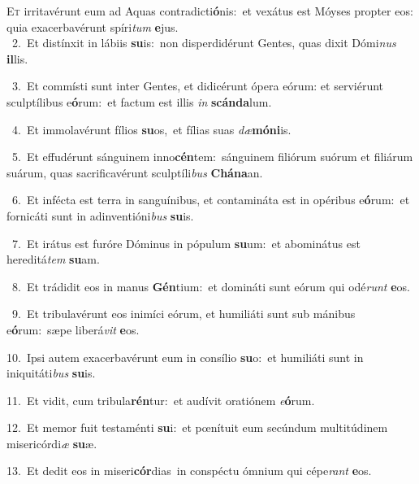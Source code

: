 \lettrine{\initial\textcolor{\initialcolor}{E}}{t} irritavérunt eum ad Aquas contradicti\-\textbf{ó}\-nis:~\star et vexátus est Móyses propter eos: quia exacerbavérunt spíri\textit{tum} \textbf{e}\-jus.\\
{\numbfont\textcolor{\numbcolor}{~2.}}~Et distínxit in lábiis \textbf{su}\-is:~\star non disperdidérunt Gentes, quas dixit Dómi\textit{nus} \textbf{il}\-lis.\par
{\numbfont\textcolor{\numbcolor}{~3.}}~Et commísti sunt inter Gentes, et didicérunt ópera eórum: et serviérunt sculptílibus e\-\textbf{ó}\-rum:~\star et factum est illis \textit{in} \textbf{scán}\-\textbf{da}lum.\par
{\numbfont\textcolor{\numbcolor}{~4.}}~Et immolavérunt fílios \textbf{su}\-os,~\star et fílias suas \textit{dæ}\-\textbf{mó}\textbf{ni}is.\par
{\numbfont\textcolor{\numbcolor}{~5.}}~Et effudérunt sánguinem inno\-\textbf{cén}\-tem:~\star sánguinem filiórum suórum et filiárum suárum, quas sacrificavérunt sculptíli\textit{bus} \textbf{Chá}\-\textbf{na}an.\par
{\numbfont\textcolor{\numbcolor}{~6.}}~Et infécta est terra in sanguínibus, et contamináta est in opéribus e\-\textbf{ó}\-rum:~\star et fornicáti sunt in adinventióni\textit{bus} \textbf{su}\-is.\par
{\numbfont\textcolor{\numbcolor}{~7.}}~Et irátus est furóre Dóminus in pópulum \textbf{su}\-um:~\star et abominátus est hereditá\textit{tem} \textbf{su}\-am.\par
{\numbfont\textcolor{\numbcolor}{~8.}}~Et trádidit eos in manus \textbf{Gén}\-tium:~\star et domináti sunt eórum qui odé\textit{runt} \textbf{e}\-os.\par
{\numbfont\textcolor{\numbcolor}{~9.}}~Et tribulavérunt eos inimíci eórum, et humiliáti sunt sub mánibus e\-\textbf{ó}\-rum:~\star sæpe liberá\textit{vit} \textbf{e}\-os.\par
{\numbfont\textcolor{\numbcolor}{10.}}~Ipsi autem exacerbavérunt eum in consílio \textbf{su}\-o:~\star et humiliáti sunt in iniquitáti\textit{bus} \textbf{su}\-is.\par
{\numbfont\textcolor{\numbcolor}{11.}}~Et vidit, cum tribula\-\textbf{rén}\-tur:~\star et audívit oratiónem \textit{e}\-\textbf{ó}rum.\par
{\numbfont\textcolor{\numbcolor}{12.}}~Et memor fuit testaménti \textbf{su}\-i:~\star et pœnítuit eum secúndum multitúdinem misericórdi\textit{æ} \textbf{su}\-æ.\par
{\numbfont\textcolor{\numbcolor}{13.}}~Et dedit eos in miseri\-\textbf{cór}\-dias~\star in conspéctu ómnium qui cépe\textit{rant} \textbf{e}\-os.\par
